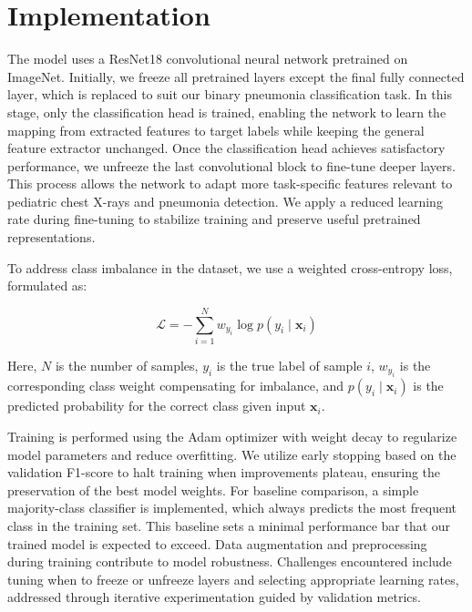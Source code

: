 \documentclass[11pt]{article}
\begin{document}
\section{Implementation}



The model uses a ResNet18 convolutional neural network pretrained on ImageNet. Initially, we freeze all pretrained layers except the final fully connected layer, which is replaced to suit our binary pneumonia classification task. In this stage, only the classification head is trained, enabling the network to learn the mapping from extracted features to target labels while keeping the general feature extractor unchanged.
Once the classification head achieves satisfactory performance, we unfreeze the last convolutional block to fine-tune deeper layers. This process allows the network to adapt more task-specific features relevant to pediatric chest X-rays and pneumonia detection. We apply a reduced learning rate during fine-tuning to stabilize training and preserve useful pretrained representations.

To address class imbalance in the dataset, we use a weighted cross-entropy loss, formulated as:

\begin{equation}
\mathcal{L} = - \sum_{i=1}^N w_{y_i} \log p(y_i \mid \mathbf{x}_i)
\label{eq:weighted_cross_entropy}
\end{equation}

Here, \(N\) is the number of samples, \(y_i\) is the true label of sample \(i\), \(w_{y_i}\) is the corresponding class weight compensating for imbalance, and \(p(y_i \mid \mathbf{x}_i)\) is the predicted probability for the correct class given input \(\mathbf{x}_i\).

Training is performed using the Adam optimizer with weight decay to regularize model parameters and reduce overfitting. We utilize early stopping based on the validation F1-score to halt training when improvements plateau, ensuring the preservation of the best model weights.
For baseline comparison, a simple majority-class classifier is implemented, which always predicts the most frequent class in the training set. This baseline sets a minimal performance bar that our trained model is expected to exceed.
Data augmentation and preprocessing during training contribute to model robustness. Challenges encountered include tuning when to freeze or unfreeze layers and selecting appropriate learning rates, addressed through iterative experimentation guided by validation metrics.
\end{document}
